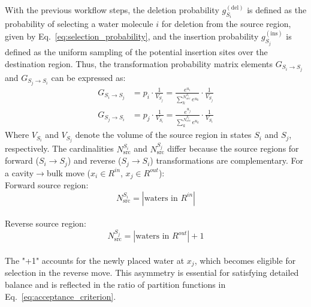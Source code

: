 \documentclass[journal=jacsat,manuscript=article]{achemso}
\begin{document}
With the previous workflow steps, the deletion probability $g_{S_i}^{(\text{del})}$ is defined as the probability of selecting a water molecule $i$ for deletion from the source region, 
given by Eq.~\ref{eq:selection_probability}, 
and the insertion probability $g_{S_j}^{(\text{ins})}$ is defined as the uniform sampling of the potential insertion sites over the destination region.
Thus, the transformation probability matrix elements $G_{S_i \to S_j}$ and $G_{S_j \to S_i}$ can be expressed as:
\begin{equation}\label{eq:transition_probability}
  \begin{aligned}
G_{S_i \to S_j} &= p_i \cdot \frac{1}{V_{S_j}} = \frac{e^{u_i}}{\sum^{N^{S_i}_{src}}_k{e^{u_k}}} \cdot \frac{1}{V_{S_j}} \\
G_{S_j \to S_i} &= p_j \cdot \frac{1}{V_{S_i}} = \frac{e^{u_j}}{\sum^{N^{S_j}_{src}}_k{e^{u_k}}} \cdot \frac{1}{V_{S_i}}  
  \end{aligned}
\end{equation}
Where $V_{S_i}$ and $V_{S_j}$ denote the volume of the source region in states $S_i$ and $S_j$, respectively.
The cardinalities $N_{\text{src}}^{S_i}$ and $N_{\text{src}}^{S_j}$ differ because the source regions for forward ($S_i \to S_j$) and reverse ($S_j \to S_i$) transformations are complementary. 
For a cavity$\to$bulk move ($x_i \in R^{in}$, $x_j \in R^{out}$): \\
Forward source region: $$N^{S_i}_{\text{src}} = |\text{waters in } R^{in}|$$ \\
Reverse source region: $$N^{S_j}_{\text{src}} = |\text{waters in } R^{out}| + 1$$ \\
The "+1" accounts for the newly placed water at $x_j$, which becomes eligible for selection in the reverse move. 
This asymmetry is essential for satisfying detailed balance and is reflected in the ratio of partition functions in Eq.~\ref{eq:acceptance_criterion}. \\
\newline
\end{document}

